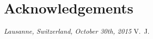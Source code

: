\chapter*{Acknowledgements}


\bigskip

\noindent\textit{Lausanne, Switzerland, October 30th, 2015}
\hfill V.~J.
